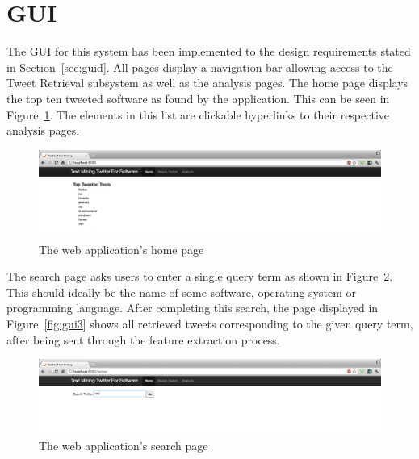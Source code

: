 \section{GUI}
The GUI for this system has been implemented to the design requirements stated in Section~\ref{sec:guid}. All pages display a navigation bar allowing access to the Tweet Retrieval subsystem as well as the analysis pages. The home page displays the top ten tweeted software as found by the application. This can be seen in Figure~\ref{fig:gui1}. The elements in this list are clickable hyperlinks to their respective analysis pages.

\begin{figure}[h]
\begin{center}
\includegraphics[width=15cm]{gui1}
\end{center}
\caption{The web application's home page}
\label{fig:gui1}
\end{figure}

The search page asks users to enter a single query term as shown in Figure~\ref{fig:gui2}. This should ideally be the name of some software, operating system or programming language. After completing this search, the page displayed in Figure~\ref{fig:gui3} shows all retrieved tweets corresponding to the given query term, after being sent through the feature extraction process.

\begin{figure}[h]
\begin{center}
\includegraphics[width=15cm]{gui2}
\end{center}
\caption{The web application's search page}
\label{fig:gui2}
\end{figure}

